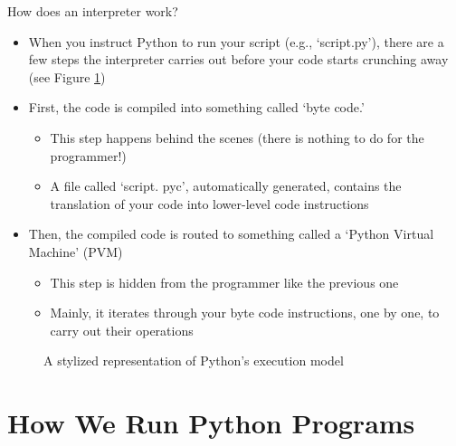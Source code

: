 \documentclass[a4paper,11pt]{book}
\newcommand{\question}[1]{%
    \begin{tcolorbox}[colback=comp_c!10,colframe=comp_c,sidebyside align=top,width=\linewidth,before skip=1ex]
        #1
    \end{tcolorbox}
    \switchcolumn%
}
\newcommand{\note}[1]{%
    \begin{tcolorbox}[colback=white!0,colframe=white!10,width=\linewidth,before skip=1ex]
        #1
    \end{tcolorbox}
}
\begin{document}
\begin{paracol}{2}
	\question{\raggedright How does an interpreter work?}
	\note{
	\begin{itemize}
		\item When you instruct Python to run your script (e.g., `script.py'), there are a few steps the interpreter carries out before your code starts crunching away (see Figure \ref{fig:python_interpreter})
		\item First, the code is compiled into something called `byte code.'
		\begin{itemize}
			\item This step happens behind the scenes (there is nothing to do for the programmer!)
    			\item A file called `script. pyc', automatically generated, contains the translation of your code into lower-level code instructions
		\end{itemize}
		\item Then, the compiled code is routed to something called a `Python Virtual Machine' (PVM)
		\begin{itemize}
			\item This step is hidden from the programmer like the previous one
			\item Mainly, it iterates through your byte code instructions, one by one, to carry out their operations
		\end{itemize}
	\end{itemize}
	}
\end{paracol}

\begin{figure}[!htbp]
	\centering
	\sffamily
	\caption{A stylized representation of Python's execution model}
	\label{fig:python_interpreter}
\end{figure}

\section{How We Run Python Programs}
\end{document}
